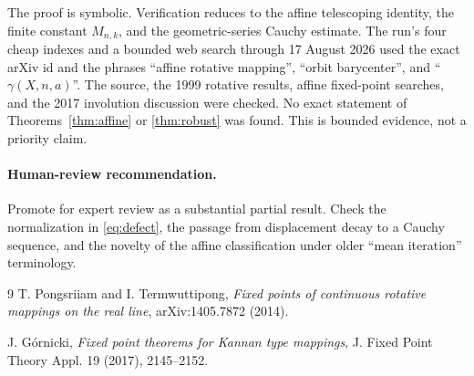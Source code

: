 \documentclass[11pt]{article}
\begin{document}
The proof is symbolic. Verification reduces to the affine telescoping identity, the
finite constant $M_{n,k}$, and the geometric-series Cauchy estimate. The run's four cheap
indexes and a bounded web search through 17 August 2026 used the exact arXiv id and the
phrases ``affine rotative mapping'', ``orbit barycenter'', and
``$\gamma(X,n,a)$''. The source, the 1999 rotative results, affine fixed-point searches,
and the 2017 involution discussion were checked. No exact statement of
Theorems~\ref{thm:affine} or \ref{thm:robust} was found. This is bounded evidence, not a
priority claim.

\paragraph{Human-review recommendation.}
Promote for expert review as a substantial partial result. Check the normalization in
\eqref{eq:defect}, the passage from displacement decay to a Cauchy sequence, and the
novelty of the affine classification under older ``mean iteration'' terminology.

\begin{thebibliography}{9}
\small
{}
T. Pongsriiam and I. Termwuttipong,
\emph{Fixed points of continuous rotative mappings on the real line},
arXiv:1405.7872 (2014).

J. G\'ornicki,
\emph{Fixed point theorems for Kannan type mappings},
J. Fixed Point Theory Appl. 19 (2017), 2145--2152.
\end{thebibliography}
\end{document}

